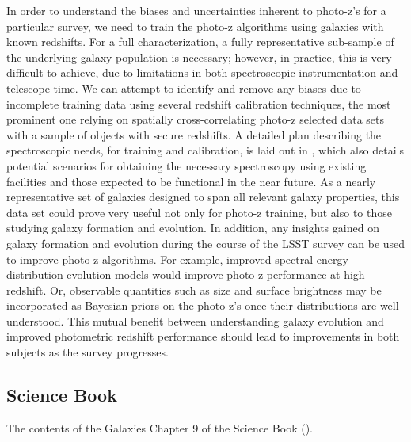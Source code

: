    In order to understand the biases and uncertainties inherent to photo-z's for a particular survey, we need to train the photo-z algorithms using galaxies with known redshifts.  For a full characterization, a fully representative sub-sample of the underlying galaxy population is necessary; however, in practice, this is very difficult to achieve, due to limitations in both spectroscopic instrumentation and telescope time.  We can attempt to identify and remove any biases due to incomplete training data using several redshift calibration techniques, the most prominent one relying on spatially cross-correlating photo-z selected data sets with a sample of objects with secure redshifts.  A detailed plan describing the spectroscopic needs, for training and calibration, is laid out in \citet[]{Newman2015}, which also details potential scenarios for obtaining the necessary spectroscopy using existing facilities and those expected to be functional in the near future.  As a nearly representative set of galaxies designed to span all relevant galaxy properties, this data set could prove very useful not only for photo-z training, but also to those studying galaxy formation and evolution.  In addition, any insights gained on galaxy formation and evolution during the course of the LSST survey can be used to improve photo-z algorithms.  For example, improved spectral energy distribution evolution models would improve photo-z performance at high redshift.  Or, observable quantities such as size and surface brightness may be incorporated as Bayesian priors on the photo-z's once their distributions are well understood.  This mutual benefit between understanding galaxy evolution and improved photometric redshift performance should lead to improvements in both subjects as the survey progresses.

\subsection{Science Book}
\label{sec:sci:gal:bkgnd:scibook}

The contents of the
Galaxies Chapter 9 of the Science Book (\citealt{LSSTSciBook}).

